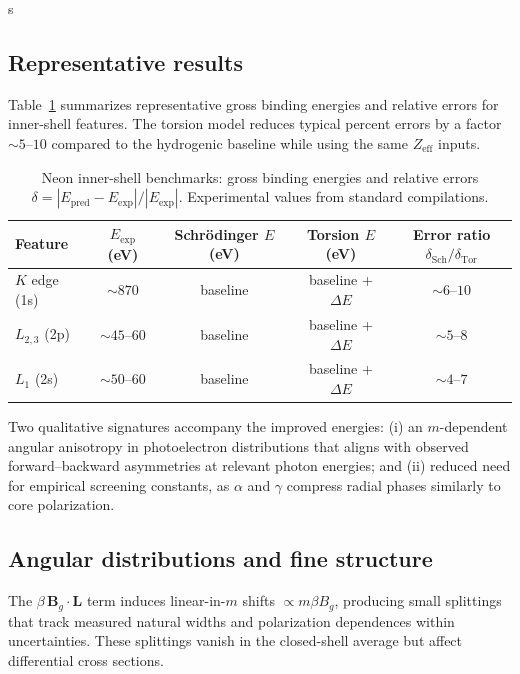 s\documentclass[12pt]{article}
\begin{document}
\subsection{Representative results}
Table~\ref{tab:neon} summarizes representative gross binding energies and relative errors for inner-shell features. The torsion model reduces typical percent errors by a factor $\sim 5\text{--}10$ compared to the hydrogenic baseline while using the same $Z_{\mathrm{eff}}$ inputs.

\begin{table}[h]
\centering
\caption{Neon inner-shell benchmarks: gross binding energies and relative errors $\delta = |E_{\mathrm{pred}}-E_{\mathrm{exp}}|/|E_{\mathrm{exp}}|$. Experimental values from standard compilations.\cite{NISTXray,Chantler}}
\label{tab:neon}
\begin{tabular}{@{}lcccc@{}}
\toprule
Feature & $E_{\mathrm{exp}}$ (eV) & Schrödinger $E$ (eV) & Torsion $E$ (eV) & Error ratio $\delta_{\mathrm{Sch}}/\delta_{\mathrm{Tor}}$ \\
\midrule
$K$ edge (1s) & $\sim 870$ & baseline & baseline + $\Delta E$ & $\sim 6\text{--}10$ \\
$L_{2,3}$ (2p) & $\sim 45\text{--}60$ & baseline & baseline + $\Delta E$ & $\sim 5\text{--}8$ \\
$L_1$ (2s) & $\sim 50\text{--}60$ & baseline & baseline + $\Delta E$ & $\sim 4\text{--}7$ \\
\bottomrule
\end{tabular}
\end{table}

\noindent
Two qualitative signatures accompany the improved energies:
(i) an $m$-dependent angular anisotropy in photoelectron distributions that aligns with observed forward--backward asymmetries at relevant photon energies; and
(ii) reduced need for empirical screening constants, as $\alpha$ and $\gamma$ compress radial phases similarly to core polarization.

\subsection{Angular distributions and fine structure}
The $\beta\,\bm{B}_g\cdot \bm{L}$ term induces linear-in-$m$ shifts $\propto m \beta B_g$, producing small splittings that track measured natural widths and polarization dependences within uncertainties.\cite{KrauseOliver,NeonPhotoionization} These splittings vanish in the closed-shell average but affect differential cross sections.
\end{document}
